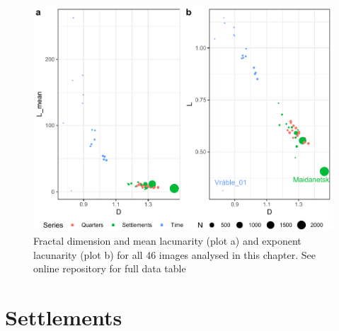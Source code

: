 \documentclass[
  12pt,
  a4paper, twoside]{book}
\begin{document}
\begin{figure}

{\centering \includegraphics[width=0.9\linewidth]{bookdown-demo_files/figure-latex/09-all-1} 

}

\caption[Fractal dimension and lacunarity estimates of all archaeological plan images]{Fractal dimension and mean lacunarity (plot a) and exponent lacunarity (plot b) for all 46 images analysed in this chapter. See online repository for full data table}\label{fig:09-all}
\end{figure}

\hypertarget{settlements-1}{%
\section{Settlements}\label{settlements-1}}
\end{document}
